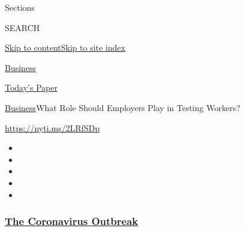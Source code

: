 Sections

SEARCH

\protect\hyperlink{site-content}{Skip to
content}\protect\hyperlink{site-index}{Skip to site index}

\href{https://www.nytimes3xbfgragh.onion/section/business}{Business}

\href{https://myaccount.nytimes3xbfgragh.onion/auth/login?response_type=cookie\&client_id=vi}{}

\href{https://www.nytimes3xbfgragh.onion/section/todayspaper}{Today's
Paper}

\href{/section/business}{Business}\textbar{}What Role Should Employers
Play in Testing Workers?

\url{https://nyti.ms/2LRfSDp}

\begin{itemize}
\item
\item
\item
\item
\item
\end{itemize}

\hypertarget{the-coronavirus-outbreak}{%
\subsubsection{\texorpdfstring{\href{https://www.nytimes3xbfgragh.onion/news-event/coronavirus?name=styln-coronavirus-markets\&region=TOP_BANNER\&variant=undefined\&block=storyline_menu_recirc\&action=click\&pgtype=Article\&impression_id=ebda9af0-e3a6-11ea-945d-0babcf13dc84}{The
Coronavirus
Outbreak}}{The Coronavirus Outbreak}}\label{the-coronavirus-outbreak}}


